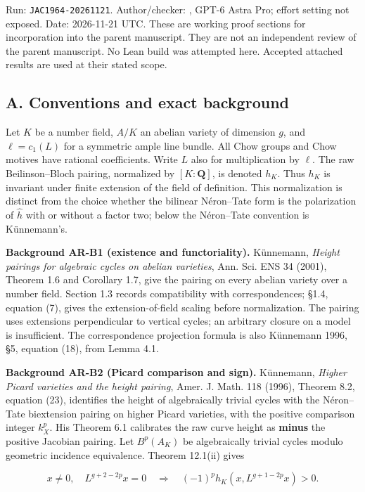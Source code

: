 \documentclass[11pt,a4paper]{article}
\begin{document}
Run: \texttt{JAC1964-20261121}. Author/checker:
, GPT-6 Astra Pro; effort setting not
exposed. Date: 2026-11-21 UTC. These are working proof sections for
incorporation into the parent manuscript. They are not an independent
review of the parent manuscript. No Lean build was attempted here.
Accepted attached results are used at their stated scope.

\subsection{A. Conventions and exact
background}\label{a.-conventions-and-exact-background}

Let \(K\) be a number field, \(A/K\) an abelian variety of dimension
\(g\), and \(\ell=c_1(L)\) for a symmetric ample line bundle. All Chow
groups and Chow motives have rational coefficients. Write \(L\) also for
multiplication by \(\ell\). The raw Beilinson--Bloch pairing, normalized
by \([K:\mathbf Q]\), is denoted \(h_K\). Thus \(h_K\) is invariant
under finite extension of the field of definition. This normalization is
distinct from the choice whether the bilinear Néron--Tate form is the
polarization of \(\widehat h\) with or without a factor two; below the
Néron--Tate convention is Künnemann's.

\textbf{Background AR-B1 (existence and functoriality).} Künnemann,
\emph{Height pairings for algebraic cycles on abelian varieties}, Ann.
Sci. ENS 34 (2001), Theorem 1.6 and Corollary 1.7, give the pairing on
every abelian variety over a number field. Section 1.3 records
compatibility with correspondences; §1.4, equation (7), gives the
extension-of-field scaling before normalization. The pairing uses
extensions perpendicular to vertical cycles; an arbitrary closure on a
model is insufficient. The correspondence projection formula is also
Künnemann 1996, §5, equation (18), from Lemma 4.1.

\textbf{Background AR-B2 (Picard comparison and sign).} Künnemann,
\emph{Higher Picard varieties and the height pairing}, Amer. J. Math.
118 (1996), Theorem 8.2, equation (23), identifies the height of
algebraically trivial cycles with the Néron--Tate biextension pairing on
higher Picard varieties, with the positive comparison integer \(k_X^p\).
His Theorem 6.1 calibrates the raw curve height as \textbf{minus} the
positive Jacobian pairing. Let \(B^p(A_K)\) be algebraically trivial
cycles modulo geometric incidence equivalence. Theorem 12.1(ii) gives

\[
 x\ne0,\quad L^{g+2-2p}x=0
 \quad\Longrightarrow\quad
 (-1)^p h_K(x,L^{g+1-2p}x)>0.
\]
\end{document}

